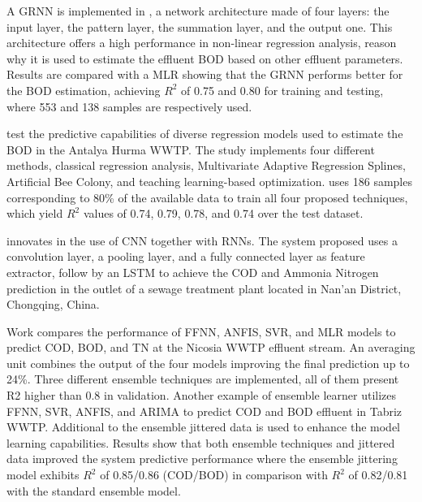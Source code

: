 A \ac{GRNN} is implemented in \cite{Heddam2016}, a network architecture made of four layers: the input layer, the pattern layer, the summation layer, and the output one. This architecture offers a high performance in non-linear regression analysis, reason why it is used to estimate the effluent \ac{BOD} based on other effluent parameters. Results are compared with a \ac{MLR} showing that the \ac{GRNN} performs better for the \ac{BOD} estimation, achieving \begin{math}R^2\end{math} of 0.75 and 0.80 for training and testing, where 553 and 138 samples are respectively used. 

\cite{Baki2019} test the predictive capabilities of diverse regression models used to estimate the \ac{BOD} in the Antalya Hurma \ac{WWTP}. The study implements four different methods, classical regression analysis, Multivariate Adaptive Regression Splines, Artificial Bee Colony, and teaching learning-based optimization. \cite{Baki2019} uses 186 samples corresponding to 80\% of the available data to train all four proposed techniques, which yield \begin{math}R^2\end{math} values of 0.74, 0.79, 0.78, and 0.74 over the test dataset.

\cite{Guo2020} innovates in the use of \ac{CNN} together with \ac{RNN}s. The system proposed  uses a convolution layer, a pooling layer, and a fully connected layer as feature extractor, follow by an \ac{LSTM} to achieve the \ac{COD} and Ammonia Nitrogen prediction in the outlet of a sewage treatment plant located in Nan'an District, Chongqing, China.

Work \cite{Nourani2018} compares the performance of \ac{FFNN}, \ac{ANFIS}, \ac{SVR}, and \ac{MLR} models to predict \ac{COD}, \ac{BOD}, and \ac{TN} at the Nicosia \ac{WWTP} effluent stream. An averaging unit combines the output of the four models improving the final prediction up to 24\%. Three different ensemble techniques are implemented, all of them present R2 higher than 0.8 in validation. Another example of ensemble learner \cite{Nourani2021} utilizes \ac{FFNN}, \ac{SVR}, \ac{ANFIS}, and \ac{ARIMA} to predict \ac{COD} and \ac{BOD} effluent in Tabriz \ac{WWTP}. Additional to the ensemble jittered data is used to enhance the model learning capabilities. Results show that both ensemble techniques and jittered data improved the system predictive performance where the ensemble jittering model exhibits \begin{math}R^2\end{math} of 0.85/0.86 (\ac{COD}/\ac{BOD}) in comparison with \begin{math}R^2\end{math} of 0.82/0.81 with the standard ensemble model.  

